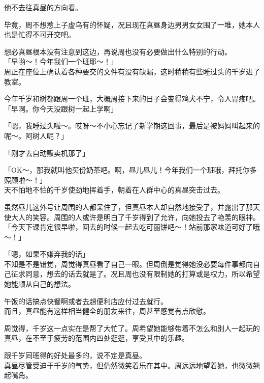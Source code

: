 他不去往真昼的方向看。

毕竟，周不想惹上子虚乌有的怀疑，况且现在真昼身边男男女女围了一堆，她本人也是忙得不可开交吧。

想必真昼根本没有注意到这边，再说周也没有必要做出什么特别的行动。\\

「早哟～！今年我们一个班耶～！」\\

周正在座位上确认着各种要交的文件有没有缺漏，这时稍稍有些睡过头的千岁进了教室。

今年千岁和树都跟周一个班，大概周接下来的日子会变得鸡犬不宁，令人胃疼吧。\\

「早啊。你今天没跟树一起上学啊」

「嗯，我睡过头啦～。哎呀～不小心忘记了新学期这回事，最后是被妈妈叫起来的呢～。阿树人呢？」

「刚才去自动贩卖机那了」

「OK～，那我就叫他买份奶茶吧。啊，昼儿昼儿！今年我们一个班哦，拜托你多照顾啦～！」\\

天不怕地不怕的千岁使劲地挥着手，朝着在人群中心的真昼突击过去。

虽然昼儿这外号让周围的人都呆住了，但真昼本人却自然地接受了，并露出了那天使大人的笑容。周围的人或许是明白了千岁得到了允许，向她投去了艳羡的眼神。\\

「今天下课肯定很早啦，回去的时候一起去吃可丽饼吧～！站前那家味道可好了哦～！」

「嗯，如果不嫌弃我的话」\\

不知是不是错觉，周觉得真昼看了自己一眼。但周倒是觉得她没必要每件事都向自己征求同意，想去的话去就是了。况且周也没有限制她的打算或是权力，所以希望她能顺从自己的想法。

午饭的话搞点快餐啊或者去趟便利店应付过去就行。\\

而且，真昼能有这样相当健全的朋友来往，周甚至感觉有点欣慰。

周觉得，千岁这一点实在是帮了大忙了。周希望她能够带着不怎么和别人一起玩的真昼，在不至于疲劳的范围内四处逛逛，享受其中的乐趣。

跟千岁同班得的好处最多的，说不定是真昼。\\

真昼尽管受迫于千岁的气势，但仍然微笑着乐在其中。周远远地望着她，也微微翘起嘴角。

